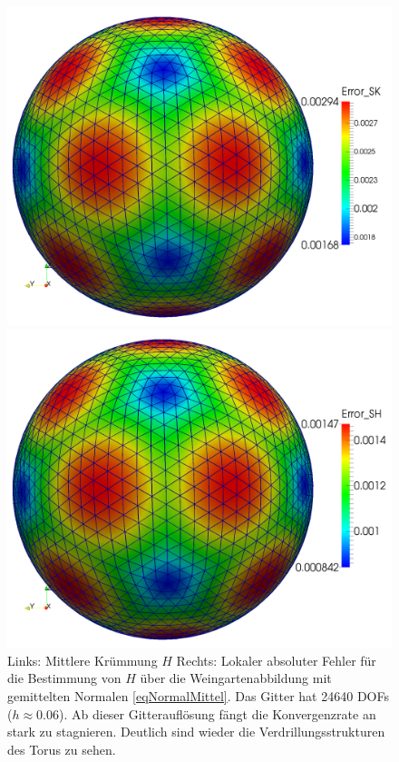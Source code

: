 \begin{figure}
        \caption[Mittlere Krümmung aus Weingartenabb. auf Torus]
                {Links: Mittlere Krümmung \( H \)
                 Rechts: Lokaler absoluter Fehler für die Bestimmung von \( H \) über die Weingartenabbildung mit gemittelten Normalen
                 \eqref{eqNormalMittel}. Das Gitter hat 24640 DOFs (\( h\approx 0.06 \)). 
                 Ab dieser Gitterauflösung fängt die Konvergenzrate an stark zu stagnieren.
                 Deutlich sind wieder die Verdrillungsstrukturen des Torus zu sehen.}
       \label{figMeanTorus}
    \begin{minipage}[t]{0.49\textwidth}
       \centering\includegraphics[width=\textwidth]{bilder/Curvature/sphere/ErrSK2k.png}
    \end{minipage}\hfill
    \begin{minipage}[t]{0.49\textwidth}
       \centering\includegraphics[width=\textwidth]{bilder/Curvature/sphere/ErrSH2k.png}

\end{minipage}
\end{figure}
